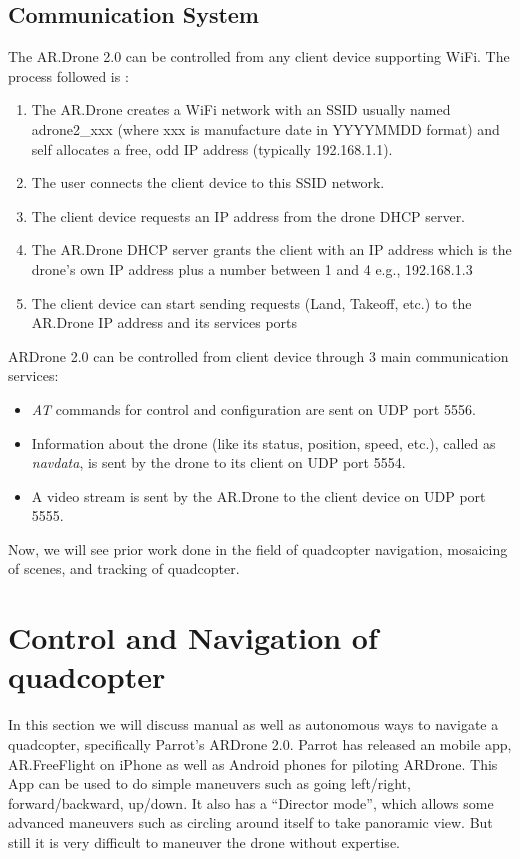 \subsection{Communication System}
The AR.Drone 2.0 can be controlled from any client device supporting WiFi. The 
process followed is :
\begin{enumerate}
  \item The AR.Drone creates a WiFi network with an SSID usually named
adrone2\_xxx (where xxx is manufacture date in YYYYMMDD format) and self
allocates a free, odd IP address (typically 192.168.1.1).

   \item The user connects the client device to this SSID network.
   \item The client device requests an IP address from the drone DHCP server.
   \item The AR.Drone DHCP server grants the client with an IP address which is
   the drone's own IP address plus a number between 1 and 4 e.g., 192.168.1.3
   \item The client device can start sending requests (Land, Takeoff, etc.) to
   the AR.Drone IP address and its services ports
\end{enumerate}

ARDrone 2.0 can be controlled from client device through 3 main communication
services: 
\begin{itemize}
\item \textit{AT} commands for control and configuration are sent on UDP
port 5556.
\item Information about the drone (like its status, position,  speed, 
etc.), called as \textit{navdata}, is sent by the drone to its client on UDP
port 5554.  
\item A video stream is sent by the AR.Drone to the client device on UDP port
5555.
\end{itemize}

Now, we will see prior work done in the field of quadcopter navigation,
mosaicing of scenes, and tracking of quadcopter.

\section{Control and Navigation of quadcopter}
In this section we will discuss manual as well as autonomous ways to navigate
a quadcopter, specifically Parrot's ARDrone 2.0.
Parrot has released an mobile app, AR.FreeFlight on iPhone as well as Android
phones for piloting ARDrone. This App can be used to do simple maneuvers such
as going left/right, forward/backward, up/down. It also has a ``Director mode'',
which allows some advanced maneuvers such as circling around itself to take
panoramic view. But still it is very difficult to maneuver the drone without
expertise.

